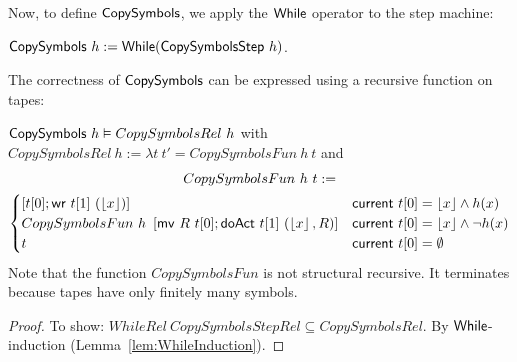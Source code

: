 Now, to define $\MS{CopySymbols}$, we apply the $\mathsf{While}$ operator to the step machine:
\begin{definition}[$\MS{CopySymbols}$]
  \label{def:CopySymbols}
  $\mathsf{CopySymbols}~h := \mathsf{While}(\mathsf{CopySymbolsStep}~h)$.
\end{definition}

The correctness of $\MS{CopySymbols}$ can be expressed using a recursive function on tapes:
\begin{lemma}
  \label{lem:CopySymbols_Realise}
  $\mathsf{CopySymbols}~h \vDash CopySymbolsRel~h$
  with $CopySymbolsRel~h := \lambda t~t' = CopySymbolsFun~h~t$ and
  \begin{multline*}
    CopySymbolsFun~h~t :=\\
    \begin{cases}
      \left[ t[0]; \mathsf{wr}~t[1]~(\left\lfloor {x} \right\rfloor) \right]                                  & \mathsf{current}~t[0]=\left\lfloor {x} \right\rfloor \land h(x) \\
      CopySymbolsFun~h~\left[ \mathsf{mv}~R~t[0]; \mathsf{doAct}~t[1]~(\left\lfloor {x} \right\rfloor, R) \right] & \mathsf{current}~t[0]=\left\lfloor {x} \right\rfloor \land \lnot h(x) \\
      t                                                                       & \mathsf{current}~t[0]=\emptyset
    \end{cases}
  \end{multline*}
  Note that the function $CopySymbolsFun$ is not structural recursive.  It terminates because tapes have only finitely many symbols.
\end{lemma}
\begin{proof}
  To show: $WhileRel~CopySymbolsStepRel \subseteq CopySymbolsRel$.  By $\mathsf{While}$-induction (Lemma~\ref{lem:WhileInduction}).
\end{proof}

